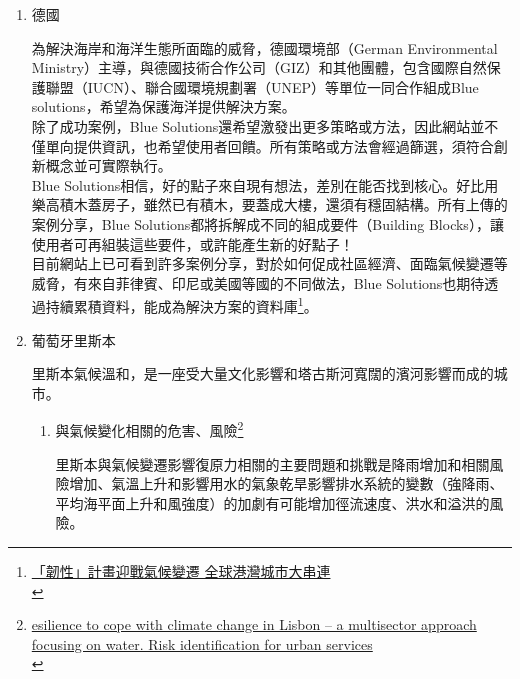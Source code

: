 \documentclass[a4paper,12pt]{article}
\begin{document}
\begin{enumerate}
\item 德國
\label{sec:orgcb3d315}

為解決海岸和海洋生態所面臨的威脅，德國環境部（German Environmental Ministry）主導，與德國技術合作公司（GIZ）和其他團體，包含國際自然保護聯盟（IUCN）、聯合國環境規劃署（UNEP）等單位一同合作組成Blue solutions，希望為保護海洋提供解決方案。\\

除了成功案例，Blue Solutions還希望激發出更多策略或方法，因此網站並不僅單向提供資訊，也希望使用者回饋。所有策略或方法會經過篩選，須符合創新概念並可實際執行。\\

Blue Solutions相信，好的點子來自現有想法，差別在能否找到核心。好比用樂高積木蓋房子，雖然已有積木，要蓋成大樓，還須有穩固結構。所有上傳的案例分享，Blue Solutions都將拆解成不同的組成要件（Building Blocks），讓使用者可再組裝這些要件，或許能產生新的好點子！\\

目前網站上已可看到許多案例分享，對於如何促成社區經濟、面臨氣候變遷等威脅，有來自菲律賓、印尼或美國等國的不同做法，Blue Solutions也期待透過持續累積資料，能成為解決方案的資料庫\footnote{\href{https://e-info.org.tw/node/103499}{「韌性」計畫迎戰氣候變遷 全球港灣城市大串連 }\\}。\\

\item 葡萄牙里斯本
\label{sec:org51579a1}

里斯本氣候溫和，是一座受大量文化影響和塔古斯河寬闊的濱河影響而成的城市。\\
\begin{enumerate}
\item 與氣候變化相關的危害、風險\footnote{\href{https://www.researchgate.net/publication/322526416\_Resilience\_to\_cope\_with\_climate\_change\_in\_Lisbon\_-\_a\_multisector\_approach\_focusing\_on\_water\_Risk\_identification\_for\_urban\_services}{esilience to cope with climate change in Lisbon – a multisector approach focusing on water. Risk identification for urban services}\\}
\label{sec:orgc6dc6c9}

里斯本與氣候變遷影響復原力相關的主要問題和挑戰是降雨增加和相關風險增加、氣溫上升和影響用水的氣象乾旱影響排水系統的變數（強降雨、平均海平面上升和風強度）的加劇有可能增加徑流速度、洪水和溢洪的風險。\\


\end{enumerate}
\end{enumerate}
\end{document}
